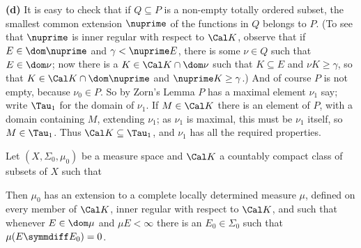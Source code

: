 {\medskip

{\bf (d)} It is easy to check that if $Q\subseteq P$ is a
non-empty totally ordered subset, the smallest common extension $\nuprime$
of the functions in $Q$ belongs to $P$.   (To see that $\nuprime$ is inner
regular with respect to $\Cal K$, observe that if $E\in\dom\nuprime$ and
$\gamma<\nuprime E$,
there is some $\nu\in Q$ such that $E\in\dom\nu$;  now there is a
$K\in\Cal K\cap\dom\nu$ such that $K\subseteq E$ and $\nu K\ge\gamma$,
so that $K\in\Cal K\cap\dom\nuprime$ and $\nuprime K\ge\gamma$.)
And of course $P$ is
not empty, because $\nu_0\in P$.   So by Zorn's Lemma $P$ has a maximal
element $\nu_1$ say;  write $\Tau_1$ for the domain of $\nu_1$.   If
$M\in\Cal K$ there is an element of $P$, with a domain containing $M$,
extending $\nu_1$; as $\nu_1$ is maximal, this must be $\nu_1$ itself,
so $M\in\Tau_1$.   Thus
$\Cal K\subseteq\Tau_1$, and $\nu_1$ has all the required properties.
}%

 Let $(X,\Sigma_0,\mu_0)$ be a measure space and
$\Cal K$ a countably compact class of subsets of $X$ such that





\noindent Then $\mu_0$ has an extension to a complete locally determined
measure $\mu$, defined on every member of $\Cal K$, inner regular with
respect to $\Cal K$, and such that whenever $E\in\dom\mu$ and $\mu
E<\infty$
there is an $E_0\in\Sigma_0$ such that $\mu(E\symmdiff E_0)=0$.

